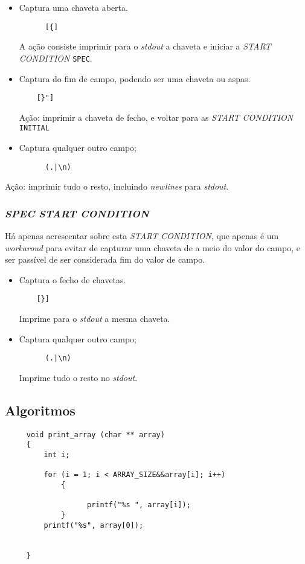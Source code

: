 \begin{itemize}
  \item Captura uma chaveta aberta.
    \begin{verbatim}
      [{]
    \end{verbatim}
    A ação consiste imprimir para o \emph{stdout} a chaveta e iniciar
    a \emph{START CONDITION} \texttt{SPEC}.

  \item Captura do fim de campo, podendo ser uma chaveta ou aspas.
    \begin{verbatim}
    [}"]
    \end{verbatim}
    Ação: imprimir a chaveta de fecho, e voltar para as \emph{START CONDITION}
    \texttt{INITIAL}

  \item Captura qualquer outro campo;
    \begin{verbatim}
      (.|\n)
    \end{verbatim}
\end{itemize}
Ação: imprimir tudo o resto, incluindo \emph{newlines} para \emph{stdout}.



\subsubsection{\emph{SPEC \emph{START CONDITION}}}

Há apenas acrescentar sobre esta \emph{START CONDITION}, que apenas é um
\emph{workaroud} para evitar de capturar uma chaveta de a meio do valor do
campo, e ser passível de ser considerada fim do valor de campo. 


\begin{itemize}
  \item Captura o fecho de chavetas.
    \begin{verbatim}
    [}]
    \end{verbatim}
    Imprime para o \emph{stdout} a mesma chaveta.


  \item Captura qualquer outro campo;
    \begin{verbatim}
      (.|\n)
    \end{verbatim}
    Imprime tudo o resto no \emph{stdout}.
  
\end{itemize}
\subsection{Algoritmos}
\label{subsec:des:algol}
\begin{verbatim}
     void print_array (char ** array)
     {
         int i;
       
         for (i = 1; i < ARRAY_SIZE&&array[i]; i++)
             {
                 
                   printf("%s ", array[i]);
             }
         printf("%s", array[0]);
                         
                                   
     }

\end{verbatim}

